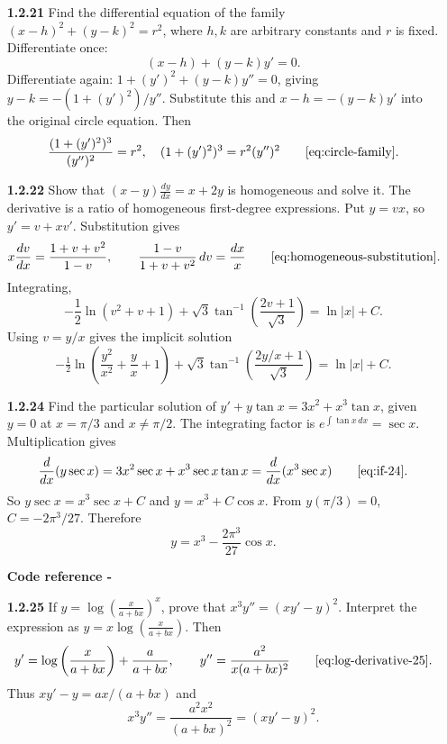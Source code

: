 \begin{enumerate}[label={},leftmargin=0pt]
\begin{enumerate}[label={},leftmargin=4mm,itemsep=9pt]
\setcounter{enumii}{21}
\setcounter{equation}{0}
\item[\textbf{1.2.21}] Find the differential equation of the family $(x-h)^2+(y-k)^2=r^2$, where $h,k$ are arbitrary constants and $r$ is fixed.
\solution Differentiate once:
\[
(x-h)+(y-k)y'=0.
\]
Differentiate again: $1+(y')^2+(y-k)y''=0$, giving $y-k=-(1+(y')^2)/y''$. Substitute this and $x-h=-(y-k)y'$ into the original circle equation. Then
\[
\frac{(1+(y')^2)^3}{(y'')^2}=r^2,
\quad(1+(y')^2)^3=r^2(y'')^2\qquad\eqref{eq:circle-family}.
\]

\setcounter{enumii}{22}
\setcounter{equation}{0}
\item[\textbf{1.2.22}] Show that $(x-y)\frac{dy}{dx}=x+2y$ is homogeneous and solve it.
\solution The derivative is a ratio of homogeneous first-degree expressions. Put $y=vx$, so $y'=v+xv'$. Substitution gives
\[
x\frac{dv}{dx}=\frac{1+v+v^2}{1-v},\qquad
\frac{1-v}{1+v+v^2}\,dv=\frac{dx}{x}\qquad\eqref{eq:homogeneous-substitution}.
\]
Integrating,
\[
-\frac12\ln(v^2+v+1)+\sqrt3\tan^{-1}\!\left(\frac{2v+1}{\sqrt3}\right)=\ln|x|+C.
\]
Using $v=y/x$ gives the implicit solution
\[
-\tfrac12\ln\!\left(\frac{y^2}{x^2}+\frac yx+1\right)+\sqrt3\tan^{-1}\!\left(\frac{2y/x+1}{\sqrt3}\right)=\ln|x|+C.
\]

\setcounter{enumii}{24}
\setcounter{equation}{0}
\item[\textbf{1.2.24}] Find the particular solution of $y'+y\tan x=3x^2+x^3\tan x$, given $y=0$ at $x=\pi/3$ and $x\ne\pi/2$.
\solution The integrating factor is $e^{\int\tan x\,dx}=\sec x$. Multiplication gives
\[
\frac{d}{dx}(y\sec x)=3x^2\sec x+x^3\sec x\tan x=\frac{d}{dx}(x^3\sec x)\qquad\eqref{eq:if-24}.
\]
So $y\sec x=x^3\sec x+C$ and $y=x^3+C\cos x$. From $y(\pi/3)=0$, $C=-2\pi^3/27$. Therefore
\[
y=x^3-\frac{2\pi^3}{27}\cos x.
\]
\par\smallskip
\noindent\textbf{Code reference -}
\par\noindent{}
\par\smallskip

\setcounter{enumii}{25}
\setcounter{equation}{0}
\item[\textbf{1.2.25}] If $y=\log\left(\frac{x}{a+bx}\right)^x$, prove that $x^3y''=(xy'-y)^2$.
\solution Interpret the expression as $y=x\log\left(\frac{x}{a+bx}\right)$. Then
\[
y'=\log\left(\frac{x}{a+bx}\right)+\frac{a}{a+bx},\qquad
 y''=\frac{a^2}{x(a+bx)^2}\qquad\eqref{eq:log-derivative-25}.
\]
Thus $xy'-y=ax/(a+bx)$ and
\[
x^3y''=\frac{a^2x^2}{(a+bx)^2}=(xy'-y)^2.
\]





\end{enumerate}
\end{enumerate}
